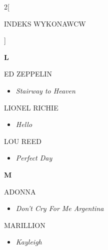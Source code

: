 \documentclass[a4paper]{report}
\begin{document}
\begin{multicols*}{2}[\begin{Huge}INDEKS WYKONAWCW\end{Huge}\vspace{1cm}]
\begin{minipage}{\columnwidth}
\begin{itemize}[topsep=3pt, after=\vspace{3mm}]
	\end{itemize}
\end{minipage}
\begin{minipage}{\columnwidth}
	\begin{Large}\textbf{L}\end{Large}ED ZEPPELIN 
	\begin{itemize}[topsep=3pt, after=\vspace{3mm}]
		\itemsep0em
		\item[]\textit{Stairway to Heaven}  \\
	\end{itemize}
\end{minipage}
\begin{minipage}{\columnwidth}
	LIONEL RICHIE 
	\begin{itemize}[topsep=3pt, after=\vspace{3mm}]
		\itemsep0em
		\item[]\textit{Hello}  \\
	\end{itemize}
\end{minipage}
\begin{minipage}{\columnwidth}
	LOU REED 
	\begin{itemize}[topsep=3pt, after=\vspace{3mm}]
		\itemsep0em
		\item[]\textit{Perfect Day}  \\
	\end{itemize}
\end{minipage}
\begin{minipage}{\columnwidth}
	\begin{Large}\textbf{M}\end{Large}ADONNA 
	\begin{itemize}[topsep=3pt, after=\vspace{3mm}]
		\itemsep0em
		\item[]\textit{Don't Cry For Me Argentina}  \\
	\end{itemize}
\end{minipage}
\begin{minipage}{\columnwidth}
	MARILLION 
	\begin{itemize}[topsep=3pt, after=\vspace{3mm}]
		\itemsep0em
		\item[]\textit{Kayleigh}  \\
	\end{itemize}

\end{minipage}
\end{multicols*}
\end{document}
